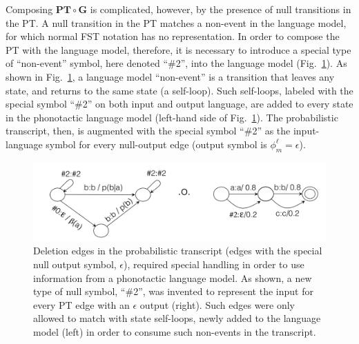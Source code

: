 Composing $\mathbf{PT}\circ \mathbf{G}$ is complicated, however, by
the presence of null transitions in the PT.  A null transition in
the PT matches a non-event in the language model, for which normal
FST notation has no representation. In order to compose the PT with
the language model, therefore, it is necessary to introduce a
special type of ``non-event'' symbol, here denoted ``\#2'', into the
language model (Fig.~\ref{fig:liu1}).  As shown in
Fig.~\ref{fig:liu1}, a language model ``non-event'' is a transition
that leaves any state, and returns to the same state (a self-loop).
Such self-loops, labeled with the special symbol ``\#2'' on both
input and output language, are added to every state in the
phonotactic language model (left-hand side of Fig.~\ref{fig:liu1}).
The probabilistic transcript, then, is augmented with the special
symbol ``\#2'' as the input-language symbol for every null-output
edge
 (output symbol is $\phi_m^\ell =\epsilon$).
\begin{figure}
  \centerline{\includegraphics[width=5in]{../figs/liu1.png}}
  \caption{Deletion edges in the probabilistic transcript (edges with
    the special null output symbol, $\epsilon$), required special
    handling in order to use information from a phonotactic language
    model.  As shown, a new type of null symbol, ``\#2'', was invented
    to represent the input for every PT edge with an $\epsilon$ output
    (right).  Such edges were only allowed to match with state
    self-loops, newly added to the language model (left) in order to
    consume such non-events in the transcript.}
  \label{fig:liu1}
\end{figure}

